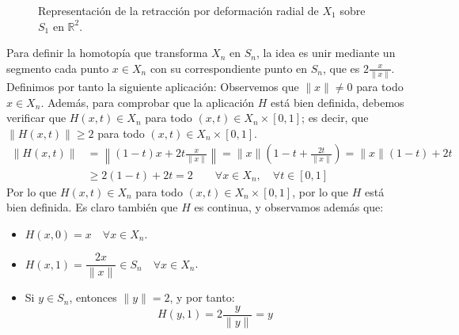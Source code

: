\documentclass[12pt]{article}
\begin{document}
\begin{ejercicio}[7.5 puntos]
\begin{enumerate}[label=\alph*)]
\begin{figure}[ht]
                    \caption{Representación de la retracción por deformación radial de $X_1$ sobre $S_1$ en $\mathbb{R}^2$.}
                    \label{fig:retracto_deformacion}
                \end{figure}

                Para definir la homotopía que transforma $X_n$ en $S_n$, la idea es unir mediante un segmento cada punto $x\in X_n$ con su correspondiente punto en $S_n$, que es $2\frac{x}{\|x\|}$. Definimos por tanto la siguiente aplicación:
                Observemos que $\|x\|\neq 0$ para todo $x\in X_n$. Además, para comprobar que la aplicación $H$ está bien definida, debemos verificar que $H(x,t)\in X_n$ para todo $(x,t)\in X_n\times [0,1]$; es decir, que $\|H(x,t)\|\geq 2$ para todo $(x,t)\in X_n\times [0,1]$.
                \begin{align*}
                    \|H(x,t)\| &= \left\|(1-t)x + 2t\frac{x}{\|x\|}\right\| = \|x\| \left(1-t+\frac{2t}{\|x\|}\right) = \|x\|(1-t) + 2t  \\
                               &\geq 2(1-t) + 2t = 2 \qquad \forall x\in X_n, \quad \forall t\in [0,1]
                \end{align*}
                Por lo que $H(x,t)\in X_n$ para todo $(x,t)\in X_n\times [0,1]$, por lo que $H$ está bien definida. Es claro también que $H$ es continua, y observamos además que:
                \begin{itemize}
                    \item $H(x,0) = x\quad \forall x\in X_n$.
                    \item $H(x,1) = \dfrac{2x}{\|x\|}\in S_n \quad \forall x\in X_n$.
                    \item Si $y\in S_n$, entonces $\|y\|=2$, y por tanto:
                        \begin{equation*}
                            H(y,1) = 2\frac{y}{\|y\|} = y 
                        \end{equation*}
                \end{itemize}


\end{enumerate}
\end{ejercicio}
\end{document}
